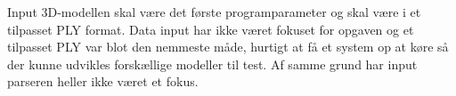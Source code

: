 Input 3D-modellen skal være det første programparameter og skal være i et tilpasset PLY format. Data input har ikke været fokuset for opgaven og et tilpasset PLY var blot den nemmeste måde, hurtigt at få et system op at køre så der kunne udvikles forskællige modeller til test. Af samme grund har input parseren heller ikke været et fokus.